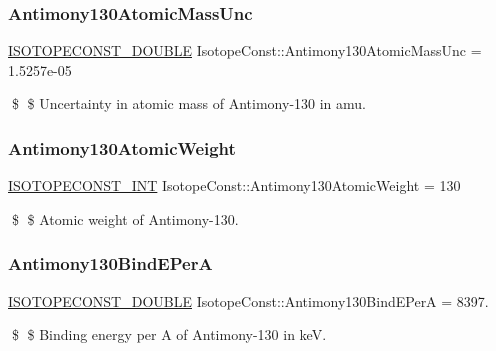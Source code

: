 \subsubsection{\texorpdfstring{Antimony130\+Atomic\+Mass\+Unc}{Antimony130AtomicMassUnc}}
{\footnotesize\ttfamily \mbox{\hyperlink{group___isotope_const-_macros_ga8f45a7272ce02c0b4c65c44636ed719a}{I\+S\+O\+T\+O\+P\+E\+C\+O\+N\+S\+T\+\_\+\+D\+O\+U\+B\+LE}} Isotope\+Const\+::\+Antimony130\+Atomic\+Mass\+Unc = 1.\+5257e-\/05}

\$ \$ Uncertainty in atomic mass of Antimony-\/130 in amu. \mbox{\label{group___isotope_const-_antimony-_sb130_ga963e60696d585f2319a56387db7dafdb}} 
\subsubsection{\texorpdfstring{Antimony130\+Atomic\+Weight}{Antimony130AtomicWeight}}
{\footnotesize\ttfamily \mbox{\hyperlink{group___isotope_const-_macros_ga5f18360b3e99483a35c32d789e62621c}{I\+S\+O\+T\+O\+P\+E\+C\+O\+N\+S\+T\+\_\+\+I\+NT}} Isotope\+Const\+::\+Antimony130\+Atomic\+Weight = 130}

\$ \$ Atomic weight of Antimony-\/130. \mbox{\label{group___isotope_const-_antimony-_sb130_ga5d6e4af9f7e484bfb2cfc36ebd7665e9}} 
\subsubsection{\texorpdfstring{Antimony130\+Bind\+E\+PerA}{Antimony130BindEPerA}}
{\footnotesize\ttfamily \mbox{\hyperlink{group___isotope_const-_macros_ga8f45a7272ce02c0b4c65c44636ed719a}{I\+S\+O\+T\+O\+P\+E\+C\+O\+N\+S\+T\+\_\+\+D\+O\+U\+B\+LE}} Isotope\+Const\+::\+Antimony130\+Bind\+E\+PerA = 8397.}

\$ \$ Binding energy per A of Antimony-\/130 in keV. \mbox{\label{group___isotope_const-_antimony-_sb130_ga3461fc03a09edc3fe77a95ccc0a5d9b6}} 
